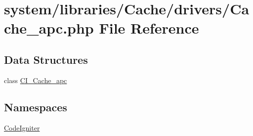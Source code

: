 \hypertarget{_cache__apc_8php}{}\section{system/libraries/\+Cache/drivers/\+Cache\+\_\+apc.php File Reference}
\label{_cache__apc_8php}
\subsection*{Data Structures}
\begin{DoxyCompactItemize}
\item 
class \mbox{\hyperlink{class_c_i___cache__apc}{C\+I\+\_\+\+Cache\+\_\+apc}}
\end{DoxyCompactItemize}
\subsection*{Namespaces}
\begin{DoxyCompactItemize}
\item 
 \mbox{\hyperlink{namespace_code_igniter}{Code\+Igniter}}
\end{DoxyCompactItemize}

